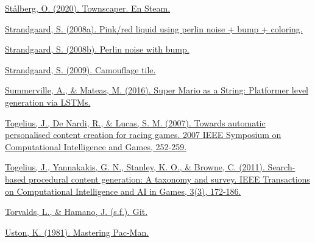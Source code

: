 \begin{thebibliography}{1}
	
	\href{https://store.steampowered.com/app/1291340/Townscaper/}{Stålberg, O. (2020). Townscaper. En Steam.}
	
	
	\href{https://www.flickr.com/photos/12739382@N04/2415197699/}{Strandgaard, S. (2008a). Pink/red liquid using perlin noise + bump + coloring.}
	
	
	\href{https://www.flickr.com/photos/12739382@N04/2630483563/}{Strandgaard, S. (2008b). Perlin noise with bump.}
	
	
	\href{https://www.flickr.com/photos/12739382@N04/3628571124/}{Strandgaard, S. (2009). Camouflage tile.}
	
	
	\href{https://arxiv.org/pdf/1603.00930.pdf}{Summerville, A., \& Mateas, M. (2016). Super Mario as a String: Platformer level generation via LSTMs.}
	
	
	
	\href{https://doi.org/10.1109/CIG.2007.368106}{Togelius, J., De Nardi, R., \& Lucas, S. M. (2007). Towards automatic personalised content creation for racing games. 2007 IEEE Symposium on Computational Intelligence and Games, 252-259.}
	
	
	\href{https://doi.org/10.1109/TCIAIG.2011.2148116}{Togelius, J., Yannakakis, G. N., Stanley, K. O., \& Browne, C. (2011). Search-based procedural content generation: A taxonomy and survey. IEEE Transactions on Computational Intelligence and AI in Games, 3(3), 172-186.}
	
	
	\href{https://git-scm.com/}{Torvalds, L., \& Hamano, J. (s.f.). Git.}
	
	
	
	\href{https://www.digitpress.com/library/books/book_mastering_pac-man.pdf}{Uston, K. (1981). Mastering Pac-Man.}
	
	

\end{thebibliography}
